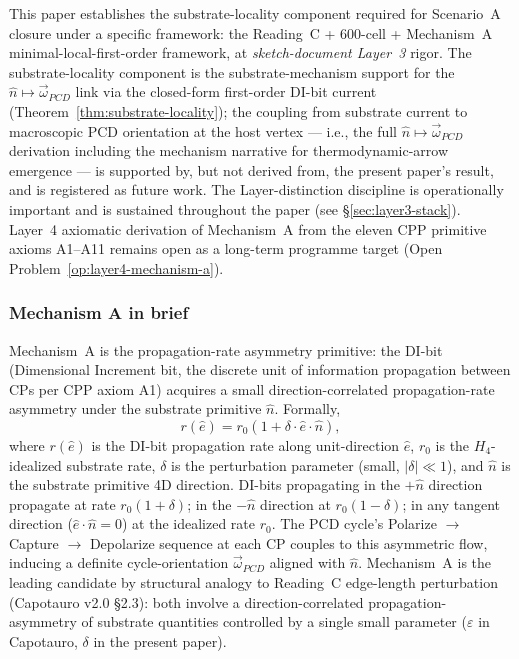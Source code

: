 \documentclass[11pt,letterpaper]{article}
\newcommand{\omegaPCD}{\vec{\omega}_{PCD}}
\begin{document}
This paper establishes the substrate-locality component required for Scenario~A closure under a specific framework: the Reading~C + 600-cell + Mechanism~A minimal-local-first-order framework, at \emph{sketch-document Layer~3} rigor. The substrate-locality component is the substrate-mechanism support for the $\hat{n} \mapsto \omegaPCD$ link via the closed-form first-order DI-bit current (Theorem~\ref{thm:substrate-locality}); the coupling from substrate current to macroscopic PCD orientation at the host vertex --- i.e., the full $\hat{n} \mapsto \omegaPCD$ derivation including the mechanism narrative for thermodynamic-arrow emergence --- is supported by, but not derived from, the present paper's result, and is registered as future work. The Layer-distinction discipline is operationally important and is sustained throughout the paper (see \S\ref{sec:layer3-stack}). Layer~4 axiomatic derivation of Mechanism~A from the eleven CPP primitive axioms A1--A11 remains open as a long-term programme target (Open Problem~\ref{op:layer4-mechanism-a}).

\subsubsection*{Mechanism A in brief}

Mechanism~A is the propagation-rate asymmetry primitive: the DI-bit (Dimensional Increment bit, the discrete unit of information propagation between CPs per CPP axiom A1) acquires a small direction-correlated propagation-rate asymmetry under the substrate primitive $\hat{n}$. Formally,
\begin{equation}
r(\hat{e}) = r_0 \left(1 + \delta \cdot \hat{e} \cdot \hat{n}\right),
\label{eq:mechanism-a}
\end{equation}
where $r(\hat{e})$ is the DI-bit propagation rate along unit-direction $\hat{e}$, $r_0$ is the $H_4$-idealized substrate rate, $\delta$ is the perturbation parameter (small, $|\delta| \ll 1$), and $\hat{n}$ is the substrate primitive 4D direction. DI-bits propagating in the $+\hat{n}$ direction propagate at rate $r_0(1 + \delta)$; in the $-\hat{n}$ direction at $r_0(1 - \delta)$; in any tangent direction ($\hat{e} \cdot \hat{n} = 0$) at the idealized rate $r_0$. The PCD cycle's Polarize $\to$ Capture $\to$ Depolarize sequence at each CP couples to this asymmetric flow, inducing a definite cycle-orientation $\omegaPCD$ aligned with $\hat{n}$. Mechanism~A is the leading candidate by structural analogy to Reading~C edge-length perturbation (Capotauro v2.0 \S2.3): both involve a direction-correlated propagation-asymmetry of substrate quantities controlled by a single small parameter ($\varepsilon$ in Capotauro, $\delta$ in the present paper).
\end{document}
